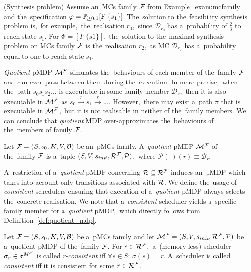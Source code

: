 \begin{example} (Synthesis problem)
Assume an~MCs family $\mathcal{F}$ from Example~\ref{exam:mcfamily} and the~specification $\varphi = \mathbb{P}_{\geq 0.1}[\mathrm{F}\ \{s_1\}]$.
The~solution to the~feasibility synthesis problem is,~for example,~the~realisation $r_0$,~since $\mathcal{D}_{r_0}$ has a~probability of $\frac{2}{3}$ to reach state $s_1$.
For $\varPhi = [F \; \{s1\}]$,~the~solution to the~maximal synthesis problem on MCs family $\mathcal{F}$ is the~realisation $r_2$,~as MC $\mathcal{D}_{r_2}$ has a~probability equal to one to reach state $s_1$.
\end{example}


\textit{Quotient} pMDP $\mathcal{M}^{\mathcal{F}}$ simulates the~behaviours of each member of the~family $\mathcal{F}$ and can even pass between them during the~execution.
In more precise,~when the~path $s_0s_1s_2 \dots$ is executable in some family member $\mathcal{D}_r$,~then it is also executable in $\mathcal{M}^{\mathcal{F}}$ as $s_0 \overset{r}{\rightarrow} s_1 \overset{r}{\rightarrow} \dots$.
However,~there may exist a~path $\pi$ that is executable in $\mathcal{M}^{\mathcal{F}}$,~but it is not realisable in neither of the~family members.
We can conclude that \textit{quotient} MDP over-approximates the~behaviours of the~members of family $\mathcal{F}$.

\begin{definition} \label{def:quotient_mdp}
\cite{roman-DP}
Let $\mathcal{F} = (S,s_{0},K, V, \mathcal{B})$ be an~pMCs family.
A~\textit{quotient} pMDP $\mathcal{M}^{\mathcal{F}}$ of the~family $\mathcal{F}$ is a~tuple $(S, V, s_{init}, \mathcal{R}^{\mathcal{F}}, \mathcal{P})$,~where $\mathcal{P}(\cdot)(r) \equiv \mathcal{B}_r$.
\end{definition}

A~restriction of a~\textit{quotient} pMDP concerning $\mathcal{R} \subseteq \mathcal{R}^{\mathcal{F}}$ induces an~pMDP which takes into account only transitions associated with $\mathcal{R}$.
We define the~usage of \textit{consistent} schedulers ensuring that execution of a~\textit{quotient} pMDP always selects the~concrete realisation.
We note that a~\textit{consistent} scheduler yields a~specific family member for a~\textit{quotient} pMDP,~which directly follows from Definition~\ref{def:quotient_mdp}.

\begin{definition}
\cite{roman-DP}
Let $\mathcal{F} = (S,s_{0},K, V, \mathcal{B})$ be a~pMCs family and let $\mathcal{M}^{\mathcal{F}} = (S, V, s_{init}, \mathcal{R}^{\mathcal{F}}, \mathcal{P})$ be a~quotient pMDP of the~family $\mathcal{F}$.
For $r \in \mathcal{R}^{\mathcal{F}}$,~a~(memory-less) scheduler $\sigma_r \in \sigma^{M^{\mathcal{F}}}$ is called \textit{r-consistent} iff $\forall s \in S: \, \sigma(s) = r$.
A~scheduler is called \textit{consistent} iff it is consistent for some $r \in \mathcal{R}^{\mathcal{F}}$.
\end{definition}